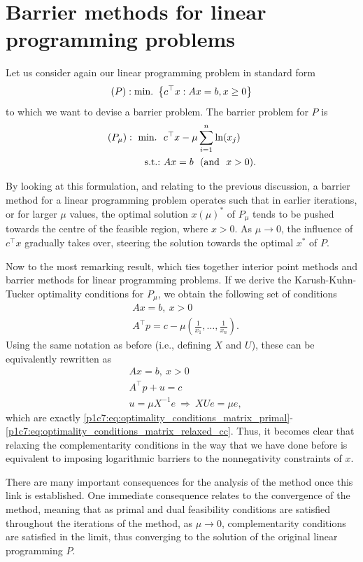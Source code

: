 \section{Barrier methods for linear programming problems}

Let us consider again our linear programming problem in standard form 
	$$
	(P) : \mathop{\text{min.~}}\left\{ c^\top x : Ax = b, x \ge 0 \right \}
	$$ 
	to which we want to devise a barrier problem. The barrier problem for $P$ is
	\begin{align*}
		(P_\mu) :~ \mathop{\text{min.~}} \ &c^\top x  - \mu\sum_{i=1}^n \ln(x_j)\\
		\mathop{\text{s.t.:~}} &Ax = b \ \ ( \text{and} \ \ x > 0). 
	\end{align*}
	
By looking at this formulation, and relating to the previous discussion, a barrier method for a linear programming problem operates such that in earlier iterations, or for larger $\mu$ values, the optimal solution $x(\mu)^*$ of $P_\mu$ tends to be pushed towards the centre of the feasible region, where $x >0$. As $\mu \to 0$, the influence of $c^\top x$ gradually takes over, steering the solution towards the optimal $x^*$ of $P$. 

Now to the most remarking result, which ties together interior point methods and barrier methods for linear programming problems. If we derive the Karush-Kuhn-Tucker optimality conditions for $P_\mu$, we obtain the following set of conditions
	\begin{align*}
		&Ax = b, \ x > 0\\ 
		&A^\top p = c - \mu\left(\frac{1}{x_1},\dots,\frac{1}{x_n}\right).
	\end{align*}
	Using the same notation as before (i.e., defining $X$ and $U$), these can be equivalently rewritten as 
		\begin{align*}
			&Ax = b, \ x > 0 \\ 
			&A^\top p + u = c \\ 
			&u = \mu X^{-1}e ~\Rightarrow~ XUe = \mu e, 
		\end{align*}
	which are exactly \eqref{p1c7:eq:optimality_conditions_matrix_primal}-\eqref{p1c7:eq:optimality_conditions_matrix_relaxed_cc}. Thus, it becomes clear that relaxing the complementarity conditions in the way that we have done before is equivalent to imposing logarithmic barriers to the nonnegativity constraints of $x$. 
	
There are many important consequences for the analysis of the method once this link is established. One immediate consequence relates to the convergence of the method, meaning that as primal and dual feasibility conditions are satisfied throughout the iterations of the method, as $\mu \to 0$, complementarity conditions are satisfied in the limit, thus converging to the solution of the original linear programming $P$. 

